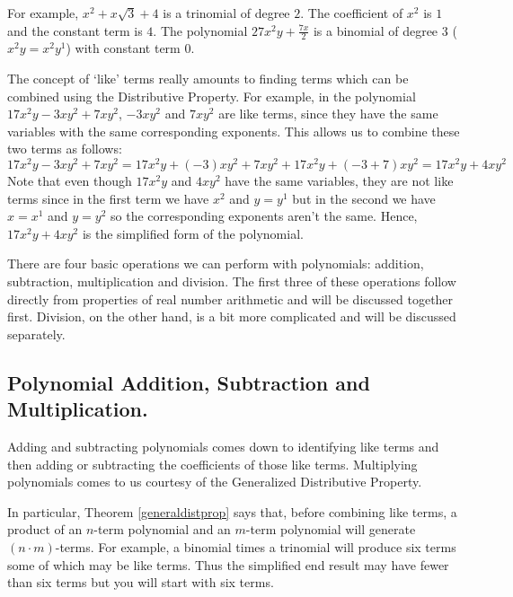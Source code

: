 \medskip

For example, $x^2 + x\sqrt{3} +4$ is a trinomial of degree $2$.  The coefficient of $x^2$ is $1$ and the constant term is $4$.  The polynomial $27x^2y + \frac{7x}{2}$ is a binomial of degree $3$ ($x^2y = x^2 y^1$) with constant term $0$.  

\medskip

The concept of `like' terms really amounts to finding terms which can be combined using the Distributive Property.  For example, in the polynomial $17x^2y - 3xy^2 + 7xy^2$, $-3xy^2$ and $7xy^2$ are like terms, since they have the same variables with the same corresponding exponents. This allows us to combine these two terms as follows:  \[17x^2y -  3xy^2 + 7xy^2 = 17x^2y + (-3)xy^2 + 7xy^2 + 17x^2y +(-3 + 7)xy^2 = 17x^2y + 4xy^2\]  Note that even though $17x^2y$ and $4xy^2$ have the same variables, they are not like terms since in the first term we have $x^2$ and $y = y^1$ but in the second we have $x = x^1$ and $y = y^2$ so the corresponding exponents aren't the same.  Hence,  $17x^2y + 4xy^2$ is the simplified form of the polynomial.  

\smallskip

There are four basic operations we can perform with polynomials:  addition, subtraction, multiplication and division. The first three of these operations follow directly from properties of real number arithmetic and will be discussed together first.  Division, on the other hand, is a bit more complicated and will be discussed separately.

\subsection{Polynomial Addition, Subtraction and Multiplication.}
\label{polyaddsubtmult}

Adding and subtracting polynomials comes down to identifying like terms and then adding or subtracting the coefficients of those like terms.  Multiplying polynomials comes to us courtesy of the Generalized Distributive Property.

\medskip


\medskip

In particular, Theorem \ref{generaldistprop} says that, before combining like terms, a product of an $n$-term polynomial and an $m$-term polynomial will generate $(n \cdot m)$-terms.  For example, a binomial times a trinomial will produce six terms some of which may be like terms.  Thus the simplified end result may have fewer than six terms but you will start with six terms. 

